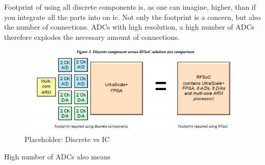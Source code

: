 Footprint of using all discrete components is, as one can imagine, higher, than if you integrate all the parts into on \gls{ic}. Not only the footprint is a concern, but also the number of connections. ADCs with high resolution, a high number of ADCs therefore explodes the necessary amount of connections. 
\begin{figure}[tbh]
	\centering
	\includegraphics[width = \textwidth]{chap/04-work/img/footprint}
	\caption{Placeholder: Discrete vs IC}
	\label{fig:footprint}
\end{figure}
High number of ADCs also means 
